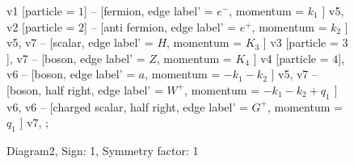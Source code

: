 \documentclass{revtex4}
\begin{document}
\begin{figure}[!htb]
\begin{center}
{    %
v1 [particle = \(1\)] -- [fermion, edge label' = \(e^{-}\), momentum = \(k_{1}\) ] v5, 
v2 [particle = \(2\)] -- [anti fermion, edge label' = \(e^{+}\), momentum = \(k_{2}\) ] v5, 
v7 -- [scalar, edge label' = \(H\), momentum = \(K_{3}\) ] v3 [particle = \(3\)], 
v7 -- [boson, edge label' = \(Z\), momentum = \(K_{4}\) ] v4 [particle = \(4\)], 
v6 -- [boson, edge label' = \(a\), momentum = \(-k_{1} - k_{2}\) ] v5, 
v7 -- [boson, half right, edge label' = \(W^{+}\), momentum = \(-k_{1} - k_{2} + q_{1}\) ] v6, 
v6 -- [charged scalar, half right, edge label' = \(G^{+}\), momentum = \(q_{1}\) ] v7, 
};
\end{center}
\caption{Diagram2, Sign: 1, Symmetry factor: 1}
\end{figure}
\newpage
\end{document}
